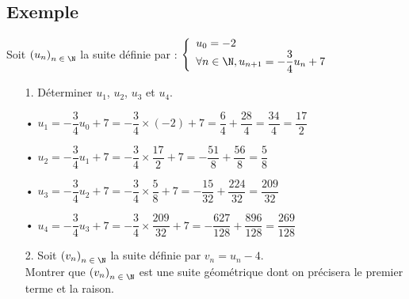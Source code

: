 \vspace*{-5cm}

\newpage

\subsection{Exemple }

Soit $\left(u_n\right)_{n\; \in \; \N}$ la suite définie par : $\left\{
  \begin{array}{lll}
    u_0 = -2 \\
    \forall n \in \N, u_{n+1} = -\dfrac{3}{4}u_n + 7
  \end{array}
\right.$

\vspace*{.3cm}

\begin{itemize}
\item[1.] Déterminer $u_1$, $u_2$, $u_3$ et $u_4$. \\
\end{itemize}

\begin{itemize}
\item[•] $u_1 = -\dfrac{3}{4}u_0 + 7 = -\dfrac{3}{4} \times \left(-2\right) + 7 = \dfrac{6}{4} + \dfrac{28}{4} = \dfrac{34}{4} = \dfrac{17}{2}$ \vspace*{.3cm} \\
\item[•] $u_2 = -\dfrac{3}{4}u_1 + 7 = -\dfrac{3}{4} \times \dfrac{17}{2} + 7 = -\dfrac{51}{8} + \dfrac{56}{8} = \dfrac{5}{8}$ \vspace*{.3cm} \\
\item[•] $u_3 = -\dfrac{3}{4}u_2 + 7 = -\dfrac{3}{4} \times \dfrac{5}{8} + 7 = -\dfrac{15}{32} + \dfrac{224}{32} = \dfrac{209}{32}$ \vspace*{.3cm} \\ 
\item[•] $u_4 = -\dfrac{3}{4}u_3 + 7 = -\dfrac{3}{4} \times \dfrac{209}{32} + 7 = -\dfrac{627}{128} + \dfrac{896}{128} = \dfrac{269}{128}$ \\ 
\end{itemize}

\vspace*{.3cm}

\begin{itemize}
\item[2.] Soit $\left(v_n\right)_{n\; \in \; \N}$ la suite définie par $v_n =u_n - 4$. \\ Montrer que $\left(v_n\right)_{n\; \in \; \N}$ est une suite géométrique dont on précisera le premier terme et la raison.
\end{itemize}

